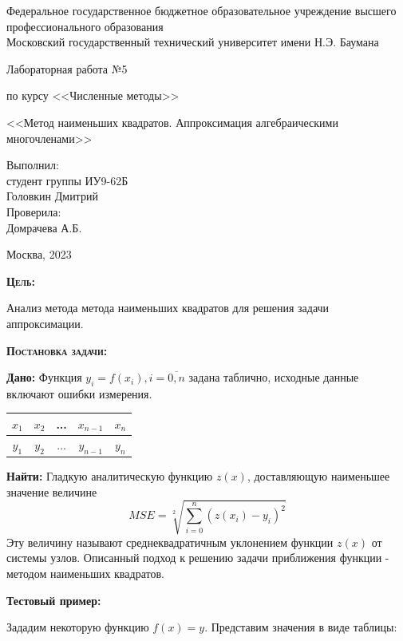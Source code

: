 \documentclass [12pt]{article}
\title{}
\date{}
\author{}
\begin{document}
\begin{titlepage}
\thispagestyle{empty}
\begin{center}
Федеральное государственное бюджетное образовательное учреждение высшего профессионального образования \\Московский государственный технический университет имени Н.Э. Баумана

\end{center}
\vfill
\centerline{\large{Лабораторная работа №5}}
\centerline{\large{по курсу <<Численные методы>>}}
\centerline{\large{<<Метод наименьших квадратов. Аппроксимация алгебраическими многочленами>>}}
\vfill
\hfill\parbox{5cm} {
           Выполнил:\\
           студент группы ИУ9-62Б \hfill \\
           Головкин Дмитрий\hfill \medskip\\
           Проверила:\\
           Домрачева А.Б.\hfill
       }
\centerline{Москва, 2023}
\clearpage
\end{titlepage}

\textsc{\textbf{Цель:}} 

Анализ метода метода наименьших квадратов для решения задачи аппроксимации.

\textsc{\textbf{Постановка задачи:}} 

\textbf{Дано:}  Функция $y_i = f(x_i),  i = \overline{0,n}$ задана таблично, исходные данные включают ошибки измерения.

\begin{table}[h]
\begin{center}
\begin{tabular}{|c|c|c|c|c|}
\hline
$x_1$ & $x_2$ & ... & $x_{n-1}$ & $x_n$ \\
\hline
$y_1$ & $y_2$ & ... & $y_{n-1}$ & $y_n$ \\
\hline
\end{tabular}
\end{center}
\end{table}

\textbf{Найти:} Гладкую аналитическую функцию  $z(x)$, доставляющую наименьшее значение величине $$ MSE=\sqrt[2]{\sum\limits_{i = 0}^n{(z(x_i) - y_i)^2}}$$ Эту величину называют среднеквадратичным уклонением функции $z(x)$ от системы узлов. Описанный подход к решению задачи приближения функции - методом наименьших квадратов.

\textbf{Тестовый пример:} 

Зададим некоторую функцию $f(x) = y$. Представим значения в виде таблицы:
\end{document}
